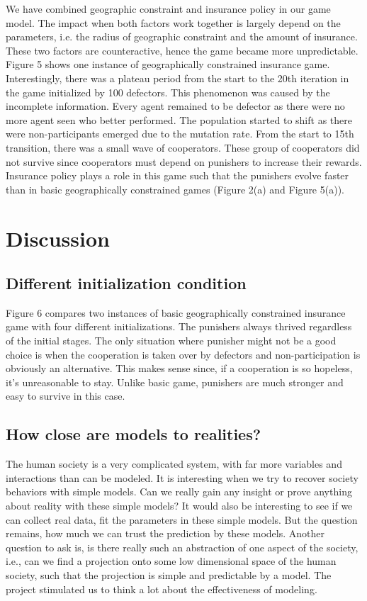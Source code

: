 \documentclass[11pt]{article}
\begin{document}
We have combined geographic constraint and insurance policy in our game model. The impact when both factors work together is largely depend on the parameters, i.e. the radius of geographic constraint and the amount of insurance. These two factors are counteractive, hence the game became more unpredictable. Figure 5 shows one instance of geographically constrained insurance game. Interestingly, there was a plateau period from the start to the 20th iteration in the game initialized by 100 defectors. This phenomenon was caused by the incomplete information. Every agent remained to be defector as there were no more agent seen who better performed. The population started to shift as there were non-participants emerged due to the mutation rate. From the start to 15th transition, there was a small wave of cooperators. These group of cooperators did not survive since cooperators must depend on punishers to increase their rewards. Insurance policy plays a role in this game such that the punishers evolve faster than in basic geographically constrained games (Figure 2(a) and Figure 5(a)).


\section{Discussion}

\subsection{Different initialization condition}
Figure 6 compares two instances of basic geographically constrained insurance game with four different initializations. The punishers always thrived regardless of the initial stages. The only situation where punisher might not be a good choice is when the cooperation is taken over by defectors and non-participation is obviously an alternative. This makes sense since, if a cooperation is so hopeless, it's unreasonable to stay. Unlike basic game, punishers are much stronger and easy to survive in this case.

\subsection{How close are models to realities?}
The human society is a very complicated system, with far more variables and interactions than can be modeled. It is interesting when we try to recover society behaviors with simple models. Can we really gain any insight or prove anything about reality with these simple models? It would also be interesting to see if we can collect real data, fit the parameters in these simple models. But the question remains, how much we can trust the prediction by these models. Another question to ask is, is there really such an abstraction of one aspect of the society, i.e., can we find a projection onto some low dimensional space of the human society, such that the projection is simple and predictable by a model. The project stimulated us to think a lot about the effectiveness of modeling.
\end{document}
